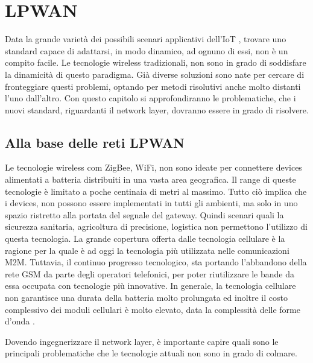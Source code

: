 \chapter{LPWAN}
Data la grande varietà dei possibili scenari applicativi dell'IoT , trovare uno standard
capace di adattarsi, in modo dinamico, ad ognuno di essi, non è un compito
facile. Le tecnologie wireless tradizionali, non sono in grado di soddisfare
la dinamicità  di questo paradigma.
Già diverse soluzioni sono nate per cercare di fronteggiare questi
problemi, optando per metodi risolutivi  anche molto distanti l'uno dall'altro.
Con questo capitolo si approfondiranno le problematiche, che i nuovi standard, riguardanti il
network layer, dovranno essere in grado di risolvere.
\section{Alla base delle reti LPWAN}  
Le tecnologie wireless com ZigBee, WiFi, non sono ideate per connettere devices
alimentati a batteria distribuiti in una vasta area geografica.
Il range di queste tecnologie è limitato a poche centinaia di metri al massimo.
Tutto ciò implica che i devices, non possono essere implementati in tutti gli
ambienti, ma solo in uno spazio ristretto alla portata del segnale del gateway.
Quindi scenari quali la sicurezza sanitaria, agricoltura di precisione, logistica non
permettono l'utilizzo di questa tecnologia.
La grande copertura offerta dalle tecnologia cellulare è la ragione per la quale
è ad oggi la tecnologia più utilizzata nelle comunicazioni M2M.
Tuttavia, il continuo progresso tecnologico, sta portando l'abbandono della rete
GSM da parte degli operatori telefonici, per poter riutilizzare le bande da essa
occupata con tecnologie più innovative. In generale, la tecnologia cellulare non
garantisce una durata della batteria molto prolungata ed inoltre il costo
complessivo dei moduli cellulari è molto elevato, data la complessità delle 
forme d'onda .

Dovendo ingegnerizzare il network layer, è importante capire quali sono le
principali problematiche che le tecnologie attuali non sono in grado di colmare.

